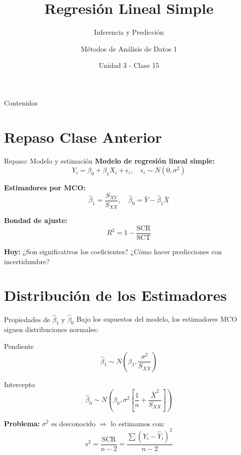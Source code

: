 \documentclass[aspectratio=169]{beamer}
\title{Regresión Lineal Simple}
\subtitle{Inferencia y Predicción}
\author{Métodos de Análisis de Datos 1}
\institute{Universidad Nacional del Sur}
\date{Unidad 3 - Clase 15}
\begin{document}
\frame{\titlepage}

\begin{frame}{Contenidos}
\tableofcontents
\end{frame}

\section{Repaso Clase Anterior}

\begin{frame}{Repaso: Modelo y estimación}
\textbf{Modelo de regresión lineal simple:}
\[
Y_i = \beta_0 + \beta_1 X_i + \epsilon_i, \quad \epsilon_i \sim N(0, \sigma^2)
\]

\vspace{0.3cm}
\textbf{Estimadores por MCO:}
\[
\hat{\beta}_1 = \frac{S_{XY}}{S_{XX}}, \quad \hat{\beta}_0 = \bar{Y} - \hat{\beta}_1 \bar{X}
\]

\vspace{0.3cm}
\textbf{Bondad de ajuste:}
\[
R^2 = 1 - \frac{\text{SCR}}{\text{SCT}}
\]

\vspace{0.5cm}
\textbf{Hoy:} ¿Son significativos los coeficientes? ¿Cómo hacer predicciones con incertidumbre?
\end{frame}

\section{Distribución de los Estimadores}

\begin{frame}{Propiedades de $\hat{\beta}_1$ y $\hat{\beta}_0$}
Bajo los supuestos del modelo, los estimadores MCO siguen distribuciones normales:

\begin{block}{Pendiente}
\[
\hat{\beta}_1 \sim N\left(\beta_1, \frac{\sigma^2}{S_{XX}}\right)
\]
\end{block}

\begin{block}{Intercepto}
\[
\hat{\beta}_0 \sim N\left(\beta_0, \sigma^2 \left[\frac{1}{n} + \frac{\bar{X}^2}{S_{XX}}\right]\right)
\]
\end{block}

\vspace{0.3cm}
\textbf{Problema:} $\sigma^2$ es desconocido $\Rightarrow$ lo estimamos con:
\[
s^2 = \frac{\text{SCR}}{n - 2} = \frac{\sum (Y_i - \hat{Y}_i)^2}{n - 2}
\]
\end{frame}
\end{document}

